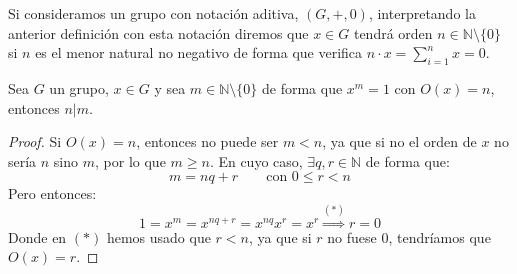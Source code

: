 \begin{notacion}
    Si consideramos un grupo con notación aditiva, $(G,+,0)$, interpretando la anterior definición con esta notación diremos que $x\in G$ tendrá orden $n\in \mathbb{N}\setminus\{0\}$ si $n$ es el menor natural no negativo de forma que verifica $n\cdot x = \sum\limits_{i=1}^{n}x = 0$.
\end{notacion}

\begin{prop}\label{prop:divide_orden}
    Sea $G$ un grupo, $x\in G$ y sea $m\in \mathbb{N}\setminus\{0\}$ de forma que $x^m = 1$ con $O(x)=n$, entonces $n|m$.
    \begin{proof}
        Si $O(x)=n$, entonces no puede ser $m<n$, ya que si no el orden de $x$ no sería $n$ sino $m$, por lo que $m\geq n$. En cuyo caso, $\exists q,r\in \mathbb{N}$ de forma que:
        \begin{equation*}
            m = nq + r \qquad \text{con\ }0\leq r < n 
        \end{equation*}
        Pero entonces:
        \begin{equation*}
            1 = x^m = x^{nq+r} = x^{nq} x^r = x^r \stackrel{(\ast)}{\Longrightarrow} r = 0
        \end{equation*}
        Donde en $(\ast)$ hemos usado que $r<n$, ya que si $r$ no fuese $0$, tendríamos que $O(x)=r$.
    \end{proof}
\end{prop}

